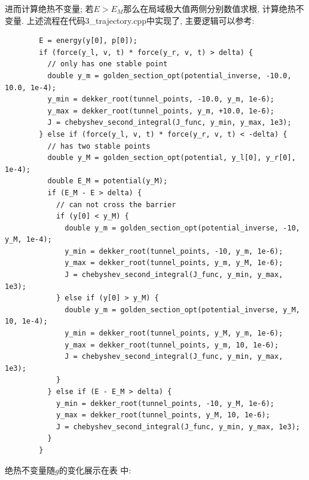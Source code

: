 \documentclass[a4paper,zihao=5,UTF8]{ctexart}
\begin{document}
    进而计算绝热不变量;
    若$E > E_M$那么在局域极大值两侧分别数值求根, 计算绝热不变量. 上述流程在代码3\_trajectory.cpp中实现了,
     主要逻辑可以参考:
     \begin{lstlisting}
        E = energy(y[0], p[0]);
        if (force(y_l, v, t) * force(y_r, v, t) > delta) {
          // only has one stable point
          double y_m = golden_section_opt(potential_inverse, -10.0, 10.0, 1e-4);
          y_min = dekker_root(tunnel_points, -10.0, y_m, 1e-6);
          y_max = dekker_root(tunnel_points, y_m, +10.0, 1e-6);
          J = chebyshev_second_integral(J_func, y_min, y_max, 1e3);
        } else if (force(y_l, v, t) * force(y_r, v, t) < -delta) {
          // has two stable points
          double y_M = golden_section_opt(potential, y_l[0], y_r[0], 1e-4);
          double E_M = potential(y_M);
          if (E_M - E > delta) {
            // can not cross the barrier
            if (y[0] < y_M) {
              double y_m = golden_section_opt(potential_inverse, -10, y_M, 1e-4);
              y_min = dekker_root(tunnel_points, -10, y_m, 1e-6);
              y_max = dekker_root(tunnel_points, y_m, y_M, 1e-6);
              J = chebyshev_second_integral(J_func, y_min, y_max, 1e3);
            } else if (y[0] > y_M) {
              double y_m = golden_section_opt(potential_inverse, y_M, 10, 1e-4);
              y_min = dekker_root(tunnel_points, y_M, y_m, 1e-6);
              y_max = dekker_root(tunnel_points, y_m, 10, 1e-6);
              J = chebyshev_second_integral(J_func, y_min, y_max, 1e3);
            }
          } else if (E - E_M > delta) {
            y_min = dekker_root(tunnel_points, -10, y_M, 1e-6);
            y_max = dekker_root(tunnel_points, y_M, 10, 1e-6);
            J = chebyshev_second_integral(J_func, y_min, y_max, 1e3);
          }
        }
     \end{lstlisting}
     \par 
     绝热不变量随$g$的变化展示在表 中:
\end{document}
